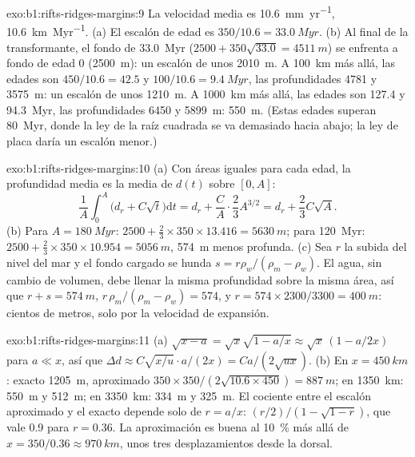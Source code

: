 \begin{solution}{exo:b1:rifts-ridges-margins:9}
La velocidad media es \qty{10.6}{mm.yr^{-1}}, \qty{10.6}{km.Myr^{-1}}. (a) El escalón de edad es
$350/10.6 = \qty{33.0}{Myr}$. (b) Al final de la transformante, el fondo
de \qty{33.0}{Myr} ($2500 + 350\sqrt{33.0} = \qty{4511}{m}$) se enfrenta a fondo de
edad 0 (\qty{2500}{m}): un escalón de unos \qty{2010}{m}. A \qty{100}{km} más allá,
las edades son $450/10.6 = 42.5$ y $100/10.6 = \qty{9.4}{Myr}$, las profundidades
4781 y \qty{3575}{m}: un escalón de unos \qty{1210}{m}. A \qty{1000}{km} más allá,
las edades son 127.4 y \qty{94.3}{Myr}, las profundidades 6450 y \qty{5899}{m}:
\qty{550}{m}. (Estas edades superan \qty{80}{Myr}, donde la ley de la raíz cuadrada
se va demasiado hacia abajo; la ley de placa daría un escalón menor.)
\end{solution}

\begin{solution}{exo:b1:rifts-ridges-margins:10}
(a) Con áreas iguales para cada edad, la profundidad media es la media de $d(t)$ sobre
$[0, A]$:
\[
  \frac1A\int_0^A\bigl(d_r + C\sqrt t\bigr)\mathrm dt = d_r + \frac CA\cdot\frac23A^{3/2}
  = d_r + \frac23C\sqrt A.
\]
(b) Para $A = \qty{180}{Myr}$: $2500 + \frac23\times350\times13.416 =
\qty{5630}{m}$; para \qty{120}{Myr}: $2500 + \frac23\times350\times10.954 =
\qty{5056}{m}$, \qty{574}{m} menos profunda. (c) Sea $r$ la subida del nivel del mar y
el fondo cargado se hunda $s = r\rho_w/(\rho_m - \rho_w)$. El agua, sin cambio de volumen,
debe llenar la misma profundidad sobre la misma área, así que $r + s = \qty{574}{m}$,
$r\,\rho_m/(\rho_m - \rho_w) = 574$, y $r = 574\times2300/3300 =
\qty{400}{m}$: cientos de metros, solo por la velocidad de expansión.
\end{solution}

\begin{solution}{exo:b1:rifts-ridges-margins:11}
(a) $\sqrt{x - a} = \sqrt x\sqrt{1 - a/x} \approx \sqrt x\,(1 - a/2x)$ para
$a \ll x$, así que
$\Delta d \approx C\sqrt{x/u}\cdot a/(2x) = Ca/(2\sqrt{ux})$.
(b) En $x = \qty{450}{km}$: exacto \qty{1205}{m}, aproximado
$350\times350/(2\sqrt{10.6\times450}) = \qty{887}{m}$; en \qty{1350}{km}:
\qty{550}{m} y \qty{512}{m}; en \qty{3350}{km}: \qty{334}{m} y
\qty{325}{m}. El cociente entre el escalón aproximado y el exacto depende solo de
$r = a/x$: $(r/2)/(1 - \sqrt{1 - r})$, que vale 0.9 para $r = 0.36$. La
aproximación es buena al \qty{10}{\percent} más allá de $x = 350/0.36 \approx
\qty{970}{km}$, unos tres desplazamientos desde la dorsal.
\end{solution}

